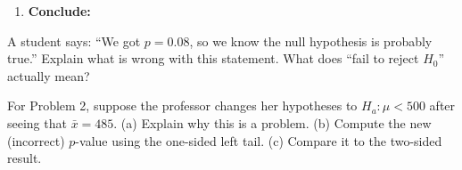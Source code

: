 \documentclass[10pt]{article}
\begin{document}
\begin{enumerate}
\begin{enumerate}[label=\alph*.]
        $p \approx$ \makebox[4cm]{\smash{\gradedblank[id=hw3c3, type=short, points=1, answer=0.0003, check=numeric, tolerance=0.0002, display={\boldmath$0.0003$}]{3.8cm}{0.19in}}}

  \boxguard
  \item \textbf{Conclude:} 
\end{enumerate}

\end{enumerate}

\begin{reflectionbox}
A student says: ``We got $p = 0.08$, so we know the null hypothesis is probably true.''
Explain what is wrong with this statement. What does ``fail to reject $H_0$'' actually mean?
\end{reflectionbox}

\begin{extensionbox}
For Problem 2, suppose the professor changes her hypotheses to $H_a: \mu < 500$ after seeing
that $\bar x = 485$. (a) Explain why this is a problem. (b) Compute the new (incorrect)
$p$-value using the one-sided left tail. (c) Compare it to the two-sided result.
\end{extensionbox}
\end{document}
